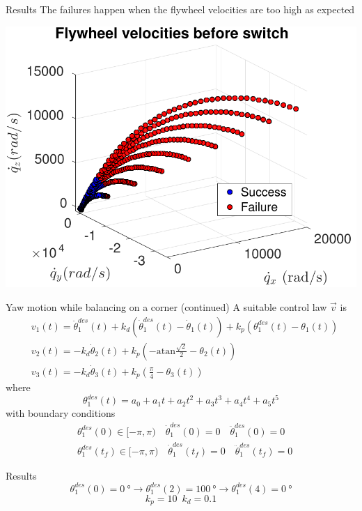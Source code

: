 \begin{frame}{Results \hfill \color{red}{XYZ}}
  The failures happen when the flywheel velocities are too high as expected
  \par
  \centering
  \includegraphics[scale=0.62]{simulation_lqr_velocities}
\end{frame}

\begin{frame}{Yaw motion while balancing on a corner (continued)}
  A suitable control law $\vec{v}$ is
  {\small
    \[
    \begin{split}
      &v_1(t) = \ddot{\theta}_1^{des}(t) + k_d(\dot{\theta}_1^{des}(t) - \dot{\theta}_1(t)) + k_p (\theta_1^{des}(t) - \theta_1(t))\\
      &v_2(t) = - k_d\dot{\theta}_2(t) + k_p \left(-\mathrm{atan}\frac{\sqrt{2}}{2} - \theta_2(t)\right)\\
      &v_3(t) = - k_d\dot{\theta}_3(t) + k_p \left(\frac{\pi}{4} - \theta_3(t)\right)
    \end{split}
    \]
  }
  where
  \[
  \theta_1^{des}(t) = a_0 + a_1 t + a_2 t^2 + a_3 t^3 + a_4 t^4 + a_5 t^5
  \]
  with boundary conditions
  \[
  \begin{split}
    &\theta_1^{des}(0) \in [-\pi, \pi) \quad \dot{\theta}_1^{des}(0)= 0 \quad \ddot{\theta}_1^{des}(0) = 0\\
      &\theta_1^{des}(t_{f}) \in [-\pi, \pi)  \quad \dot{\theta}_1^{des}(t_{f})= 0 \quad \ddot{\theta}_1^{des}(t_{f}) = 0
  \end{split}
  \]
\end{frame}

\begin{frame}{Results}
  \[\theta_1^{des}(0) = \SI{0}{\degree} \rightarrow \theta_1^{des}(2) = \SI{100}{\degree}
  \rightarrow \theta_1^{des}(4) = \SI{0}{\degree}\]
  \[k_p = 10 \enspace k_d = 0.1\]
  \begin{center}
  \end{center}
\end{frame}

